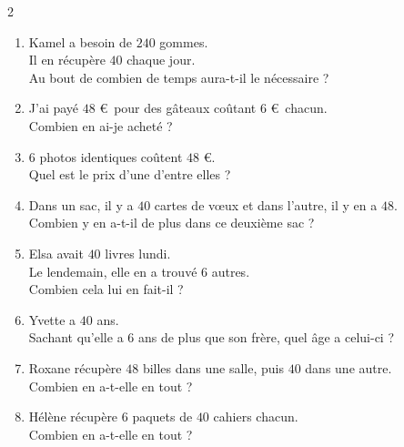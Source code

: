 \documentclass[10pt,a4paper]{article}
\begin{document}
    \begin{multicols}{2}
\begin{enumerate}[itemsep=1em]
	\item Kamel a besoin de $240$ gommes.\\Il en récupère $40$ chaque jour.\\Au bout de combien de temps aura-t-il le nécessaire ?
	\item J'ai payé $48$ €~pour des gâteaux coûtant $6$ €~chacun.\\Combien en ai-je acheté ?
	\item $6$ photos identiques coûtent $48$ €.\\Quel est le prix d'une d'entre elles ?
	\item Dans un sac, il y a $40$ cartes de v\oe ux et dans l'autre, il y en a $48$.\\Combien y en a-t-il de plus dans ce deuxième sac ?
	\item Elsa avait $40$ livres lundi. \\Le lendemain, elle en a trouvé $6$ autres.\\Combien cela lui en fait-il ?
	\item Yvette a $40$ ans.\\Sachant qu'elle a $6$ ans de plus que son frère, quel âge a celui-ci ?
	\item Roxane récupère $48$ billes dans une salle, puis $40$ dans une autre.\\Combien en a-t-elle en tout ?
	\item Hélène récupère $6$ paquets de $40$ cahiers chacun.\\Combien en a-t-elle en tout ?
\end{enumerate}
 
    \end{multicols}
\end{document}
